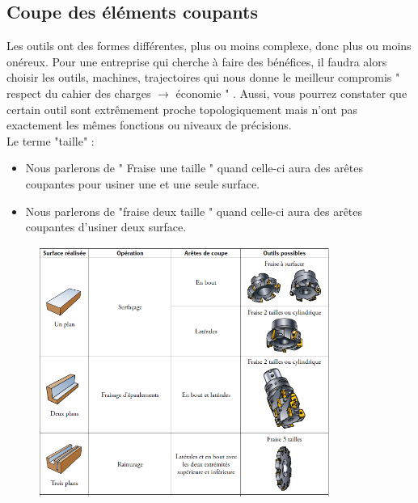 \documentclass[
	11pt, %
	fleqn, %
	a4paper, %
]{LegrandOrangeBook}
\begin{document}
\subsection{Coupe des éléments coupants}
Les outils ont des formes différentes, plus ou moins complexe, donc plus ou moins onéreux. Pour une entreprise qui cherche à faire des bénéfices, il faudra alors choisir les outils, machines, trajectoires qui nous donne le meilleur compromis " respect du cahier des charges $\rightarrow$ économie " . Aussi, vous pourrez constater que certain outil sont extrêmement proche topologiquement mais n'ont pas exactement les mêmes fonctions ou niveaux de précisions. \\
Le terme "taille" :
\begin{itemize}
    \item Nous parlerons de " Fraise une taille " quand celle-ci aura des arêtes coupantes pour usiner une et une seule surface.
    \item Nous parlerons de "fraise deux taille " quand celle-ci aura des arêtes coupantes d'usiner deux surface.
\end{itemize}

\begin{figure}[H] %
	\centering %
	\includegraphics[width=0.85\textwidth]{Images/T12.png} %

	\label{fig:placeholder} %
\end{figure}
\end{document}
